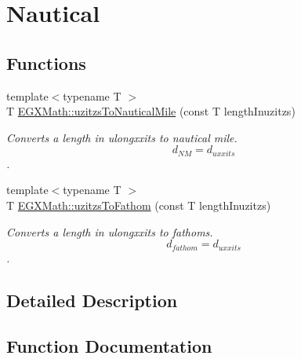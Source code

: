 \hypertarget{group___e_g_x_math-_conversions-_length_conversions-uzitzs-_nautical}{}\section{Nautical}
\label{group___e_g_x_math-_conversions-_length_conversions-uzitzs-_nautical}
\subsection*{Functions}
\begin{DoxyCompactItemize}
\item 
{\footnotesize template$<$typename T $>$ }\\T \mbox{\hyperlink{group___e_g_x_math-_conversions-_length_conversions-uzitzs-_nautical_ga71c06fc85e22f77eba0b234edefa4562}{E\+G\+X\+Math\+::uzitzs\+To\+Nautical\+Mile}} (const T length\+Inuzitzs)
\begin{DoxyCompactList}\small\item\em Converts a length in ulongxxits to nautical mile. \[ d_{NM}=d_{uxxits} \]. \end{DoxyCompactList}\item 
{\footnotesize template$<$typename T $>$ }\\T \mbox{\hyperlink{group___e_g_x_math-_conversions-_length_conversions-uzitzs-_nautical_gaaff17ba6c6a9c899108fccf746059d03}{E\+G\+X\+Math\+::uzitzs\+To\+Fathom}} (const T length\+Inuzitzs)
\begin{DoxyCompactList}\small\item\em Converts a length in ulongxxits to fathoms. \[ d_{fathom}=d_{uxxits} \]. \end{DoxyCompactList}\end{DoxyCompactItemize}


\subsection{Detailed Description}


\subsection{Function Documentation}
\mbox{\label{group___e_g_x_math-_conversions-_length_conversions-uzitzs-_nautical_gaaff17ba6c6a9c899108fccf746059d03}} 
